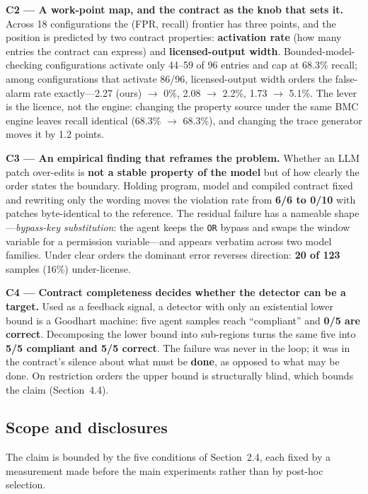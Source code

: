 \documentclass[acmsmall,screen,review,anonymous]{acmart}
\begin{document}
\noindent\textbf{C2 --- A work-point map, and the contract as the knob that sets it.} Across 18 configurations the (FPR, recall) frontier has three points, and the position is predicted by two contract properties: \textbf{activation rate} (how many entries the contract can express) and \textbf{licensed-output width}. Bounded-model-checking configurations activate only 44--59 of 96 entries and cap at 68.3\% recall; among configurations that activate 86/96, licensed-output width orders the false-alarm rate exactly---2.27 (ours) $\to$ 0\%, 2.08 $\to$ 2.2\%, 1.73 $\to$ 5.1\%. The lever is the licence, not the engine: changing the property source under the same BMC engine leaves recall identical (68.3\% $\to$ 68.3\%), and changing the trace generator moves it by 1.2 points.

\noindent\textbf{C3 --- An empirical finding that reframes the problem.} Whether an LLM patch over-edits is \textbf{not a stable property of the model} but of how clearly the order states the boundary. Holding program, model and compiled contract fixed and rewriting only the wording moves the violation rate from \textbf{6/6 to 0/10} with patches byte-identical to the reference. The residual failure has a nameable shape---\emph{bypass-key substitution}: the agent keeps the \texttt{OR} bypass and swaps the window variable for a permission variable---and appears verbatim across two model families. Under clear orders the dominant error reverses direction: \textbf{20 of 123} samples (16\%) under-license.

\noindent\textbf{C4 --- Contract completeness decides whether the detector can be a target.} Used as a feedback signal, a detector with only an existential lower bound is a Goodhart machine: five agent samples reach ``compliant'' and \textbf{0/5 are correct}. Decomposing the lower bound into sub-regions turns the same five into \textbf{5/5 compliant and 5/5 correct}. The failure was never in the loop; it was in the contract's silence about what must be \textbf{done}, as opposed to what may be done. On restriction orders the upper bound is structurally blind, which bounds the claim (Section~4.4).

\subsection{Scope and disclosures}

The claim is bounded by the five conditions of Section~2.4, each fixed by a measurement made before the main experiments rather than by post-hoc selection.
\end{document}
